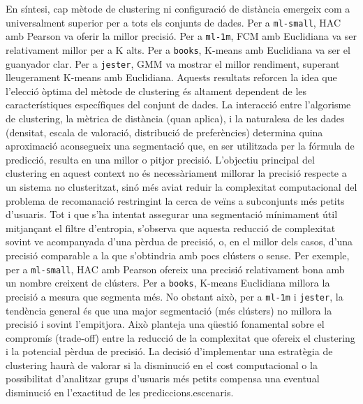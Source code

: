\documentclass[a4paper,12pt]{report}
\begin{document}
En síntesi, cap mètode de clustering ni configuració de distància emergeix com a universalment superior per a tots els conjunts de dades. Per a \texttt{ml-small}, HAC amb Pearson va oferir la millor precisió. Per a \texttt{ml-1m}, FCM amb Euclidiana va ser relativament millor per a K alts. Per a \texttt{books}, K-means amb Euclidiana va ser el guanyador clar. Per a \texttt{jester}, GMM va mostrar el millor rendiment, superant lleugerament K-means amb Euclidiana. Aquests resultats reforcen la idea que l'elecció òptima del mètode de clustering és altament dependent de les característiques específiques del conjunt de dades. La interacció entre l'algorisme de clustering, la mètrica de distància (quan aplica), i la naturalesa de les dades (densitat, escala de valoració, distribució de preferències) determina quina aproximació aconsegueix una segmentació que, en ser utilitzada per la fórmula de predicció, resulta en una millor o pitjor precisió. L'objectiu principal del clustering en aquest context no és necessàriament millorar la precisió respecte a un sistema no clusteritzat, sinó més aviat reduir la complexitat computacional del problema de recomanació restringint la cerca de veïns a subconjunts més petits d'usuaris. Tot i que s'ha intentat assegurar una segmentació mínimament útil mitjançant el filtre d'entropia, s'observa que aquesta reducció de complexitat sovint ve acompanyada d'una pèrdua de precisió, o, en el millor dels casos, d'una precisió comparable a la que s'obtindria amb pocs clústers o sense. Per exemple, per a \texttt{ml-small}, HAC amb Pearson ofereix una precisió relativament bona amb un nombre creixent de clústers. Per a \texttt{books}, K-means Euclidiana millora la precisió a mesura que segmenta més. No obstant això, per a \texttt{ml-1m} i \texttt{jester}, la tendència general és que una major segmentació (més clústers) no millora la precisió i sovint l'empitjora. Això planteja una qüestió fonamental sobre el compromís (trade-off) entre la reducció de la complexitat que ofereix el clustering i la potencial pèrdua de precisió. La decisió d'implementar una estratègia de clustering haurà de valorar si la disminució en el cost computacional o la possibilitat d'analitzar grups d'usuaris més petits compensa una eventual disminució en l'exactitud de les prediccions.escenaris.
\end{document}
